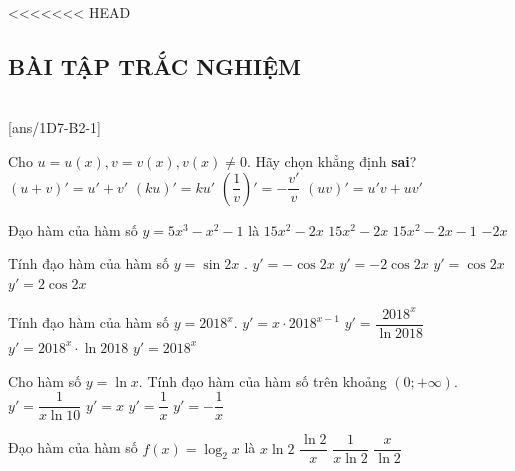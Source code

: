 <<<<<<< HEAD
\subsection{BÀI TẬP TRẮC NGHIỆM}
 \\
\setcounter{ex}{0}
[ans/1D7-B2-1]

\begin{ex}%
	Cho $ u=u(x), v=v(x), v(x)\ne 0 $. Hãy chọn khẳng định \textbf{sai}?
	\choice
	{$(u+v)'=u'+v'$}
	{$(ku)'=ku'$}
	{\True $\left(\dfrac{1}{v}\right)'=-\dfrac{v'}{v}$}
	{$(uv)'=u'v+uv'$}
\end{ex}

\begin{ex}
	Đạo hàm của hàm số $y=5x^3-x^2-1$ là
	\choice
	{\True $15x^2-2x$}
	{$15x^2-2x$}
	{$15x^2-2x-1$}
	{$-2x$}
\end{ex}

\begin{ex}%
	Tính đạo hàm của hàm số $y=\sin 2x$ .
	\choice
	{$y'=-\cos 2x$}
	{$y'=-2\cos 2x$}
	{$y'=\cos 2x$}
	{\True $y'=2\cos 2x$}
\end{ex}


\begin{ex}
	Tính đạo hàm của hàm số $ y=2018^x $.
	\choice
	{$ y'=x\cdot 2018^{x-1} $}
	{$ y'=\dfrac{2018^x}{\ln 2018} $}
	{\True $ y'=2018^x \cdot \ln 2018 $}
	{$ y'=2018^x $}
\end{ex}

\begin{ex}
	Cho hàm số $y=\ln x$. Tính đạo hàm của hàm số trên khoảng $(0; +\infty)$.
	\choice
	{$y'=\dfrac{1}{x\ln10}$}
	{$y'=x$}
	{\True $y'=\dfrac{1}{x}$}
	{$y'=-\dfrac{1}{x}$}
\end{ex}

\begin{ex}
	Đạo hàm của hàm số $f(x)=\log_2 x$ là
	\choice
	{$x\ln2$}
	{$\dfrac{\ln2}{x}$}
	{\True $\dfrac{1}{x\ln2}$}
	{$\dfrac{x}{\ln2}$}
\end{ex}

